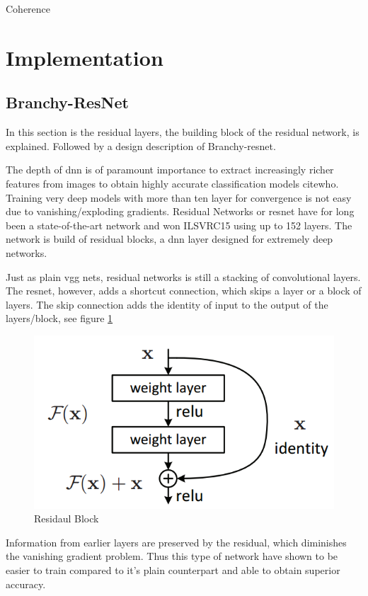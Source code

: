 Coherence 


\section{Implementation}

\subsection{Branchy-ResNet} 

In this section is the residual layers, the building block of the residual network, is explained. Followed by a design description of Branchy-\gls{resnet}.

The depth of \gls{dnn} is of paramount importance to extract increasingly richer features from images to obtain highly accurate classification models cite{who}. Training very deep models with more than ten layer for convergence is not easy due to vanishing/exploding gradients. Residual Networks or \gls{resnet} \cite{he_deep_2015} have for long been a state-of-the-art network and won ILSVRC15 using up to 152 layers. The network is build of residual blocks, a \gls{dnn} layer designed for extremely deep networks. 

Just as plain \gls{vgg} nets, residual networks is still a stacking of  convolutional layers. The \gls{resnet}, however, adds a shortcut connection, which skips a layer or a block of layers. The skip connection adds the identity of input to the output of the layers/block, see figure \ref{fig:residualblock}

\begin{figure}
	\centering
	\includegraphics[width=.5\linewidth]{figures/models/residualblock}
	\caption[Residual Block]{Residaul Block}
	\label{fig:residualblock}
\end{figure}

Information from earlier layers are preserved by the residual, which diminishes the vanishing gradient problem. Thus this type of network have shown to be easier to train compared to it’s plain counterpart and able to obtain superior accuracy.  


